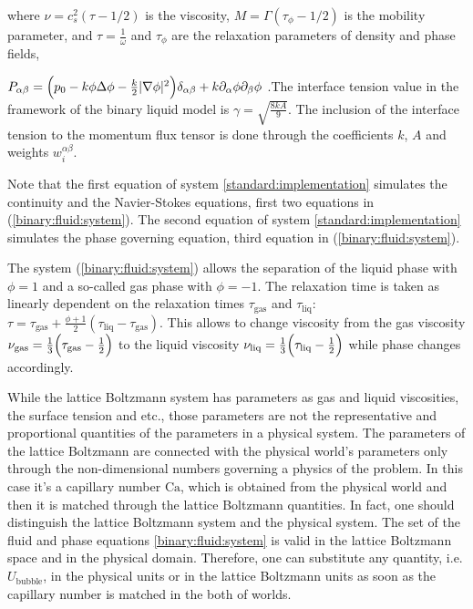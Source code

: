 \documentclass[preprint,12pt]{elsarticle}
\newcommand{\Ca}{\mathrm{Ca}}
\begin{document}
where $\nu=c_s^2 (\tau-1/2)$ is the viscosity,
$M=\Gamma(\tau_{\phi}-1/2)$ is the mobility parameter, and $\tau=\frac{1}{\omega}$ and $\tau_{\phi}$
are the relaxation parameters of density and phase fields, {\color{red}
$P_{\alpha\beta}=\Bigl(p_0-k\phi \Delta \phi -\frac{k}{2}|\nabla \phi|^2\Bigr)\delta_{\alpha\beta}
+ k \partial_{\alpha} \phi \partial_{\beta} \phi$  \cite{pooley-contact}.The interface tension value
in the framework of the binary liquid model is $\gamma=\sqrt{\frac{8 k
A}{9}}$. The inclusion of the interface tension to the momentum flux tensor is done through the
coefficients $k$, $A$ and weights $w_i^{\alpha\beta}$.

Note that the first equation of system \ref{standard:implementation} simulates the continuity and
the Navier-Stokes equations, first two equations in (\ref{binary:fluid:system}). The second equation
of system \ref{standard:implementation} simulates the phase governing equation, third equation in
(\ref{binary:fluid:system}).} The system (\ref{binary:fluid:system}) allows the separation of the
liquid
phase with $\phi=1$ and a so-called gas phase with $\phi=-1$. The
relaxation time is taken as linearly dependent on the relaxation
times $\tau_{\mathrm{gas}}$ and $\tau_{\mathrm{liq}}$:
$\tau=\tau_{\mathrm{gas}}+\frac{\phi+1}{2}(\tau_{\mathrm{liq}}-\tau_{\mathrm{gas}})$. This allows
to change viscosity from the gas viscosity
$\nu_{\mathrm{gas}}=\frac{1}{3}\Bigl(\tau_{\mathrm{gas}}-\frac{1}{2}\Bigr)$ to the liquid viscosity
$\nu_{\mathrm{liq}}=\frac{1}{3}\Bigl(\tau_{\mathrm{liq}}-\frac{1}{2}\Bigr)$ while phase changes
accordingly.

{\color{red}
While the lattice Boltzmann system has parameters as gas and liquid
viscosities, the surface tension and etc., those parameters are not the representative and
proportional quantities of the parameters in a physical system. The parameters of the lattice
Boltzmann are connected with the physical world's parameters only through the non-dimensional
numbers governing a physics of the problem. In this case it's a capillary number $\Ca$, which is
obtained from the physical world and then it is matched through the lattice Boltzmann quantities.
In fact, one should distinguish the lattice Boltzmann system and the physical system. The set of
the fluid and phase equations \eqref{binary:fluid:system} is valid in the lattice Boltzmann space
and in the physical domain. Therefore, one can substitute any quantity, i.e.
$U_{\mathrm{bubble}}$, in the physical units or in the lattice Boltzmann units as soon as the
capillary number is matched in the both of worlds.} 
\end{document}
